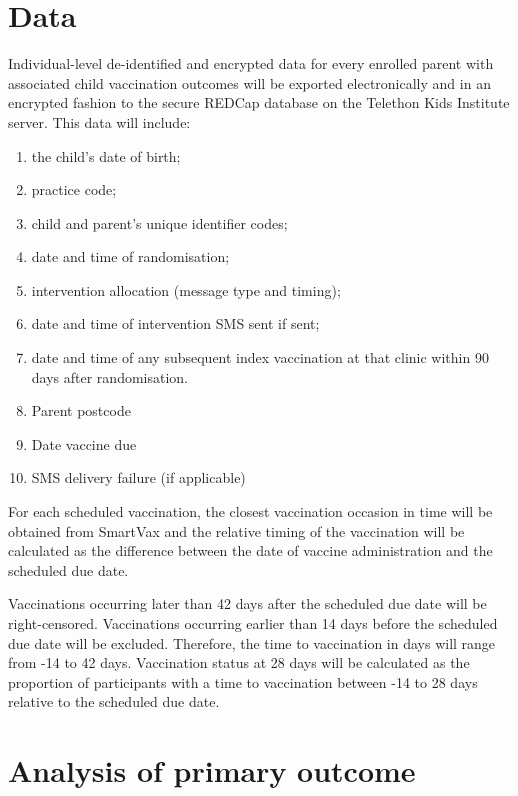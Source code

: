 \documentclass[
  bibliography=totoc]{scrreprt}
\providecommand{\tightlist}{%
  \setlength{\itemsep}{0pt}\setlength{\parskip}{0pt}}
\begin{document}
\hypertarget{data}{%
\section{Data}\label{data}}

Individual-level de-identified and encrypted data for every enrolled parent with associated child vaccination outcomes will be exported electronically and in an encrypted fashion to the secure REDCap database on the Telethon Kids Institute server.
This data will include:

\begin{enumerate}
\def\labelenumi{\arabic{enumi}.}
\tightlist
\item
  the child's date of birth;
\item
  practice code;
\item
  child and parent's unique identifier codes;
\item
  date and time of randomisation;
\item
  intervention allocation (message type and timing);
\item
  date and time of intervention SMS sent if sent;
\item
  date and time of any subsequent index vaccination at that clinic within 90 days after randomisation.
\item
  Parent postcode
\item
  Date vaccine due
\item
  SMS delivery failure (if applicable)
\end{enumerate}

For each scheduled vaccination, the closest vaccination occasion in time will be obtained from SmartVax and the relative timing of the vaccination will be calculated as the difference between the date of vaccine administration and the scheduled due date.

Vaccinations occurring later than 42 days after the scheduled due date will be right-censored.
Vaccinations occurring earlier than 14 days before the scheduled due date will be excluded.
Therefore, the time to vaccination in days will range from -14 to 42 days.
Vaccination status at 28 days will be calculated as the proportion of participants with a time to vaccination between -14 to 28 days relative to the scheduled due date.

\hypertarget{analysis-of-primary-outcome}{%
\section{Analysis of primary outcome}\label{analysis-of-primary-outcome}}
\end{document}

